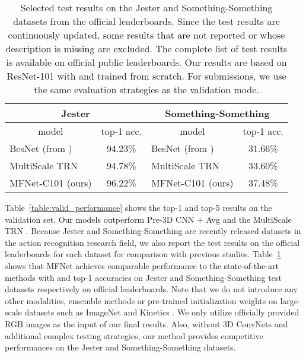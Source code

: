 \documentclass[runningheads]{llncs}
\newcommand{\nj}[1]{\textcolor{black}{#1}}
\begin{document}
\setlength{\tabcolsep}{4pt}
\begin{table}[t]
\begin{center}
\caption{Selected test results on the Jester and Something-Something datasets from the official leaderboards. Since the test results are continuously updated, some results that \nj{are} not reported or whose description \nj{is missing} are excluded. The complete list of test results is available on official public leaderboards. Our results are based on ResNet-101 with  and trained from scratch. For submissions, we use the same evaluation strategies \nj{as} the validation mode.}
\begin{tabular}{l|c|l|c}
\hline
\multicolumn{2}{c|}{Jester} & \multicolumn{2}{c}{Something-Something} \\
\hline
\multicolumn{1}{c|}{model} & \multicolumn{1}{c|}{top-1 acc.} & \multicolumn{1}{c|}{model} & \multicolumn{1}{c}{top-1 acc.} \\
\hline
BesNet (from \cite{zhou2017temporal}) 	&94.23\%&BesNet (from \cite{zhou2017temporal}) 		&31.66\%\\
MultiScale TRN \cite{zhou2017temporal}	&94.78\%&MultiScale TRN \cite{zhou2017temporal} 	  &33.60\%\\
\hline
MFNet-C101 (ours)	 &96.22\%&MFNet-C101 (ours)			&37.48\%\\
\hline
\end{tabular}
\label{table:test_performance}
\end{center}
\end{table}
\setlength{\tabcolsep}{1.4pt}


Table~\ref{table:valid_performance} shows the top-1 and top-5 results on the validation set. Our models outperform Pre-3D CNN + Avg \cite{goyal2017something} and the MultiScale TRN \cite{zhou2017temporal}. Because Jester and Something-Something are recently released datasets in the action recognition research field, we also report the test results on the official leaderboards for each dataset for comparison with previous studies. Table~\ref{table:test_performance} shows that MFNet achieves comparable performance \nj{to the state-of-the-art methods} with  and  top-1 accuracies on Jester and Something-Something test datasets respectively on official leaderboards. Note that we do not introduce any other modalities, ensemble methods \nj{or} pre-trained initialization weights on large-scale datasets such as ImageNet \cite{deng2009imagenet} and Kinetics \cite{kay2017kinetics}. We only utilize officially provided RGB images as the input of our final results. Also, without 3D ConvNets and additional complex testing strategies, our method provides competitive performances on the Jester and Something-Something datasets.   
\end{document}
